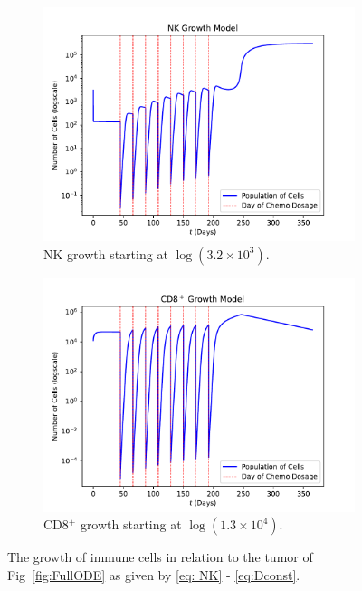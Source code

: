 \documentclass[11pt]{amsart}
\begin{document}
\begin{figure}[h!]
\centering
	\begin{subfigure}{.5\textwidth}
  		\centering
 		 \includegraphics[scale=0.43]{./images/NK_growth_8T_3W_C45_semiy.pdf}
 		 \caption{NK growth starting at $\log(3.2\times 10^3)$.}\label{fig:NKGrowth}
	\end{subfigure}%
	\begin{subfigure}{.5\textwidth}
  		\centering
  		\includegraphics[scale=0.43]{./images/CD8_growth_8T_3W_C45_semiy.pdf}
  		\caption{CD8$^+$ growth starting at $\log(1.3\times 10^4)$.}\label{fig:CD8Growth}
	\end{subfigure}
	\caption{The growth of immune cells in relation to the tumor of Fig~\ref{fig:FullODE} as given by \eqref{eq: NK} - \eqref{eq:Dconst}.}\label{fig:NKCD8_log_growth}
\end{figure}
\end{document}
